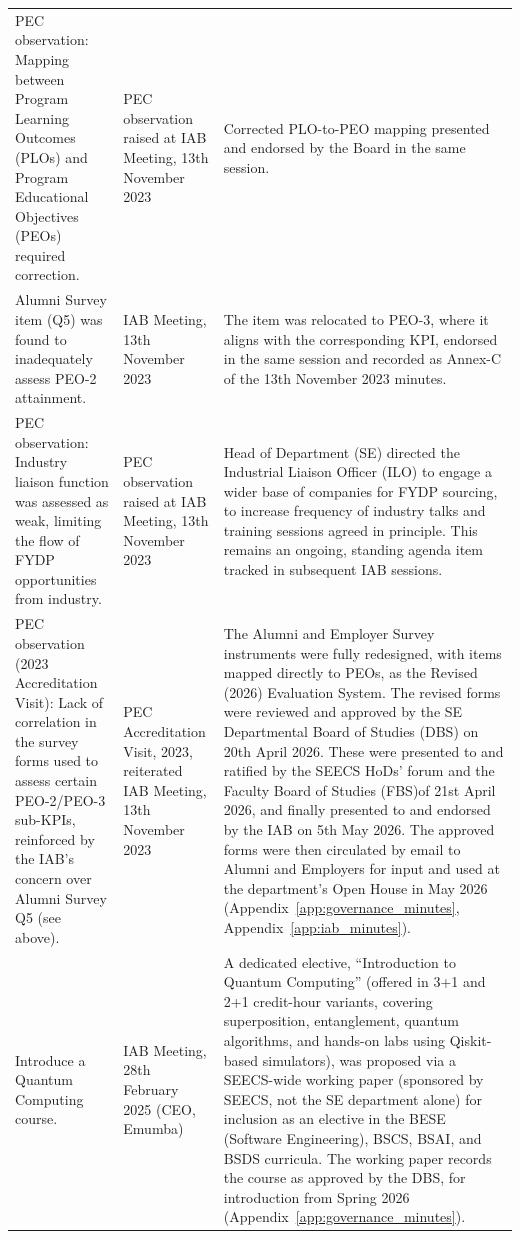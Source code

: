 \begin{longtable}[]{@{}>{\raggedright\arraybackslash}p{}>{\raggedright\arraybackslash}p{}>{\raggedright\arraybackslash}p{}@{}}
\addlinespace
PEC observation: Mapping between Program Learning Outcomes (PLOs) and Program Educational Objectives (PEOs) required correction. & PEC observation raised at IAB Meeting, 13th November 2023 & Corrected PLO-to-PEO mapping presented and endorsed by the Board in the same session.\\
\addlinespace
Alumni Survey item (Q5) was found to inadequately assess PEO-2 attainment. & IAB Meeting, 13th November 2023 & The item was relocated to PEO-3, where it aligns with the corresponding KPI, endorsed in the same session and recorded as Annex-C of the 13th November 2023 minutes.\\
\addlinespace
PEC observation: Industry liaison function was assessed as weak, limiting the flow of FYDP opportunities from industry. & PEC observation raised at IAB Meeting, 13th November 2023 & Head of Department (SE) directed the Industrial Liaison Officer (ILO) to engage a wider base of companies for FYDP sourcing, to increase frequency of industry talks and training sessions agreed in principle. This remains an ongoing, standing agenda item tracked in subsequent IAB sessions.\\
\addlinespace
PEC observation (2023 Accreditation Visit): Lack of correlation in the survey forms used to assess certain PEO-2/PEO-3 sub-KPIs, reinforced by the IAB's concern over Alumni Survey Q5 (see above). & PEC Accreditation Visit, 2023, reiterated IAB Meeting, 13th November 2023 & The Alumni and Employer Survey instruments were fully redesigned, with items mapped directly to PEOs, as the Revised (2026) Evaluation System. The revised forms were reviewed and approved by the SE Departmental Board of Studies (DBS) on 20th April 2026. These were presented to and ratified by the SEECS HoDs' forum and the Faculty Board of Studies (FBS)of 21st April 2026, and finally presented to and endorsed by the IAB on 5th May 2026. The approved forms were then circulated by email to Alumni and Employers for input and used at the department's Open House in May 2026 (Appendix~\ref{app:governance_minutes}, Appendix~\ref{app:iab_minutes}).\\
\addlinespace
Introduce a Quantum Computing course. & IAB Meeting, 28th February 2025 (CEO, Emumba) & A dedicated elective, ``Introduction to Quantum Computing'' (offered in 3+1 and 2+1 credit-hour variants, covering superposition, entanglement, quantum algorithms, and hands-on labs using Qiskit-based simulators), was proposed via a SEECS-wide working paper (sponsored by SEECS, not the SE department alone) for inclusion as an elective in the BESE (Software Engineering), BSCS, BSAI, and BSDS curricula. The working paper records the course as approved by the DBS, for introduction from Spring 2026 (Appendix~\ref{app:governance_minutes}).\\

\end{longtable}
